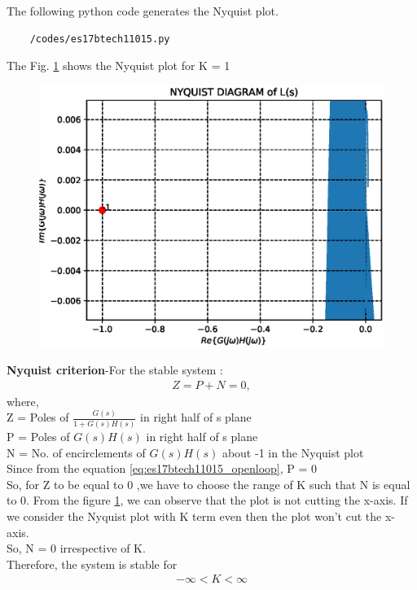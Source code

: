 The following python code generates the Nyquist plot.
\begin{lstlisting}
    /codes/es17btech11015.py
\end{lstlisting}
%
The  Fig.  \ref{fig:es17btech11015} shows the Nyquist plot for K = 1 
\begin{figure}[!h]
  \centering
  \includegraphics[width=\columnwidth]{./figs/es17btech11015.eps}
  \caption{}
  \label{fig:es17btech11015}
\end{figure}

\textbf{Nyquist criterion}-For the stable system :
\begin{align}
\label{eq:es17btech11015_nyquist}
Z = P+N = 0,    
\end{align}
where, 
\\
Z = Poles of $\frac{G(s)}{1+G(s)H(s)} $  in right half of s plane
\\

P = Poles of $G(s)H(s) $ in right half of s plane
\\

N = No. of encirclements of $G(s)H(s)$ about -1 in the Nyquist plot
\\

Since from the equation \eqref{eq:es17btech11015_openloop}, P = 0 
\\

So, for Z to be equal to 0 ,we have to choose the range of K such that N is equal to 0.
From the figure \ref{fig:es17btech11015}, we can observe that the plot is not cutting the x-axis. If we consider the Nyquist plot with K term even then the plot won't cut the x-axis. 
\\
So, N = 0 irrespective of K. 
\\
Therefore, the system is stable for 
\begin{align}
    -\infty < K < \infty
\end{align}

